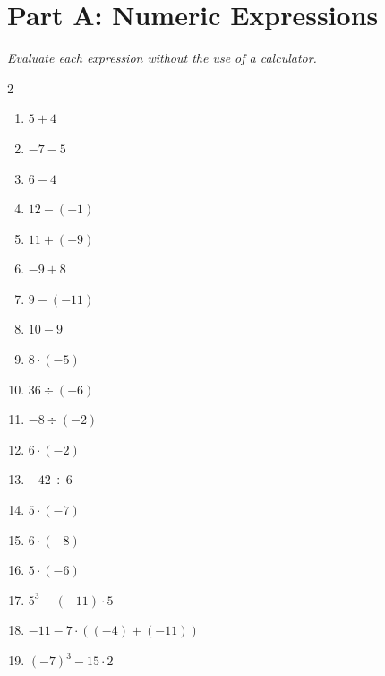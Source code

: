 \documentclass[11pt]{article}
\begin{document}
\section*{Part A: Numeric Expressions}
\noindent\textit{Evaluate each expression without the use of a calculator.}
\begin{multicols}{2}
\begin{enumerate}
  \item $5 + 4$
  \vspace{1.1cm}
  \item $-7 - 5$
  \vspace{1.1cm}
  \item $6 - 4$
  \vspace{1.1cm}
  \item $12 - (-1)$
  \vspace{1.1cm}
  \item $11 + (-9)$
  \vspace{1.1cm}
  \item $-9 + 8$
  \vspace{1.1cm}
  \item $9 - (-11)$
  \vspace{1.1cm}
  \item $10 - 9$
  \vspace{1.1cm}
  \item $8 \cdot (-5)$
  \vspace{1.1cm}
  \item $36 \div (-6)$
  \vspace{1.1cm}
  \item $-8 \div (-2)$
  \vspace{1.1cm}
  \item $6 \cdot (-2)$
  \vspace{1.1cm}
  \item $-42 \div 6$
  \vspace{1.1cm}
  \item $5 \cdot (-7)$
  \vspace{1.1cm}
  \item $6 \cdot (-8)$
  \vspace{1.1cm}
  \item $5 \cdot (-6)$
  \vspace{1.1cm}
  \item $5^{3} - (-11) \cdot 5$
  \vspace{1.1cm}
  \item $-11 - 7 \cdot ((-4) + (-11))$
  \vspace{1.1cm}
  \item $(-7)^{3} - 15 \cdot 2$

\end{enumerate}
\end{multicols}
\end{document}
